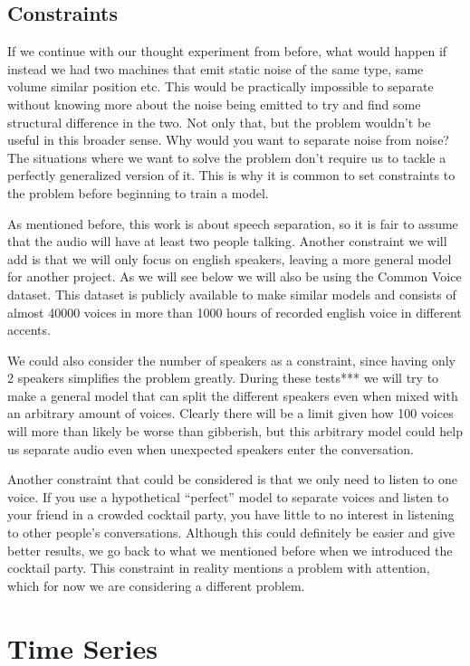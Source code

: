 \documentclass{book}
\begin{document}
\section{Constraints}
\qquad If we continue with our thought experiment from before, what would happen if instead we had two machines that emit static noise of the same type, same volume similar position etc. This would be practically impossible to separate without knowing more about the noise being emitted to try and find some structural difference in the two. Not only that, but the problem wouldn’t be useful in this broader sense. Why would you want to separate noise from noise? The situations where we want to solve the problem don’t require us to tackle a perfectly generalized version of it. This is why it is common to set constraints to the problem before beginning to train a model.
\par
As mentioned before, this work is about speech separation, so it is fair to assume that the audio will have at least two people talking. Another constraint we will add is that we will only focus on english speakers, leaving a more general model for another project. As we will see below we will also be using the Common Voice dataset. This dataset is publicly available to make similar models and consists of almost 40000 voices in more than 1000 hours of recorded english voice in different accents.
\par
We could also consider the number of speakers as a constraint, since having only 2 speakers simplifies the problem greatly. During these tests*** we will try to make a general model that can split the different speakers even when mixed with an arbitrary amount of voices. Clearly there will be a limit given how 100 voices will more than likely be worse than gibberish, but this arbitrary model could help us separate audio even when unexpected speakers enter the conversation.
\par
Another constraint that could be considered is that we only need to listen to one voice. If you use a hypothetical “perfect” model to separate voices and listen to your friend in a crowded cocktail party, you have little to no interest in listening to other people's conversations. Although this could definitely be easier and give better results, we go back to what we mentioned before when we introduced the cocktail party. This constraint in reality mentions a problem with attention, which for now we are considering a different problem.

\chapter{Time Series}
\end{document}
